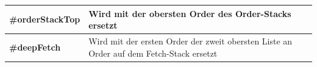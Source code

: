 \begin{table}[h]
\begin{tabular}{l|l}
    \textbf{\#orderStackTop}     & Wird mit der obersten Order des Order-Stacks ersetzt                                                                                                                                                                                  \\ \hline
    \textbf{\#deepFetch}         & Wird mit der ersten Order der zweit obersten Liste an Order auf dem Fetch-Stack ersetzt                                                                                                                                                                                                                                 
    \end{tabular}
\end{table}

